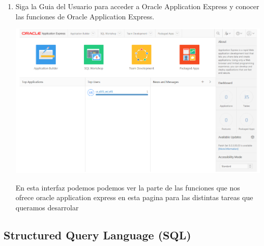 \documentclass[12pt,letterpaper]{article}
\begin{document}
\begin{enumerate}[1.]
     
     
     
     
     
     
     
     
     
     
    \item Siga la Guia del Usuario para acceder a Oracle Application Express y conocer las funciones de
Oracle Application Express.

\includegraphics[width=15cm]{./carolinaImagen/imagen4.png}
    
En esta interfaz podemos podemos ver la parte de las funciones que nos ofrece oracle application express en esta  pagina para las distintas tareas que queramos  desarrolar
		
		




		\end{enumerate}









\newpage
\subsection{Structured Query Language (SQL)}
\end{document}
